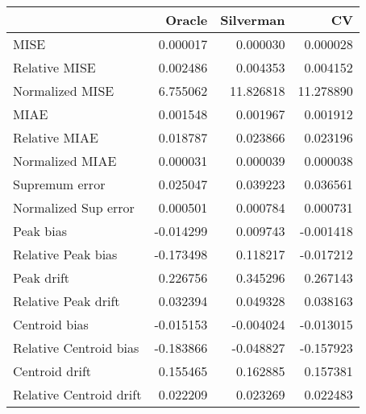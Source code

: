 \begin{tabular}{lrrr}
  \toprule
 & Oracle & Silverman & CV \\ 
  \midrule
MISE & 0.000017 & 0.000030 & 0.000028 \\ 
  Relative MISE & 0.002486 & 0.004353 & 0.004152 \\ 
  Normalized MISE & 6.755062 & 11.826818 & 11.278890 \\ 
  MIAE & 0.001548 & 0.001967 & 0.001912 \\ 
  Relative MIAE & 0.018787 & 0.023866 & 0.023196 \\ 
  Normalized MIAE & 0.000031 & 0.000039 & 0.000038 \\ 
  Supremum error & 0.025047 & 0.039223 & 0.036561 \\ 
  Normalized Sup error & 0.000501 & 0.000784 & 0.000731 \\ 
  Peak bias & -0.014299 & 0.009743 & -0.001418 \\ 
  Relative Peak bias & -0.173498 & 0.118217 & -0.017212 \\ 
  Peak drift & 0.226756 & 0.345296 & 0.267143 \\ 
  Relative Peak drift & 0.032394 & 0.049328 & 0.038163 \\ 
  Centroid bias & -0.015153 & -0.004024 & -0.013015 \\ 
  Relative Centroid bias & -0.183866 & -0.048827 & -0.157923 \\ 
  Centroid drift & 0.155465 & 0.162885 & 0.157381 \\ 
  Relative Centroid drift & 0.022209 & 0.023269 & 0.022483 \\ 
   \bottomrule
\end{tabular}
